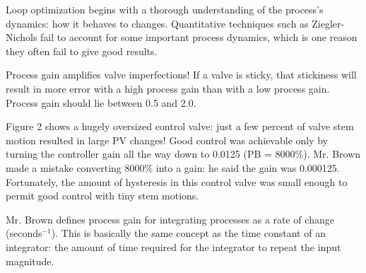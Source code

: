 












Loop optimization begins with a thorough understanding of the process's dynamics: how it behaves to changes.  Quantitative techniques such as Ziegler-Nichols fail to account for some important process dynamics, which is one reason they often fail to give good results.

\vskip 10pt

Process gain amplifies valve imperfections!  If a valve is sticky, that stickiness will result in more error with a high process gain than with a low process gain.  Process gain should lie between 0.5 and 2.0.

\vskip 10pt

Figure 2 shows a hugely oversized control valve: just a few percent of valve stem motion resulted in large PV changes!  Good control was achievable only by turning the controller gain all the way down to 0.0125 (PB = 8000\%).  Mr. Brown made a mistake converting 8000\% into a gain: he said the gain was 0.000125.  Fortunately, the amount of hysteresis in this control valve was small enough to permit good control with tiny stem motions.

\vskip 10pt

Mr. Brown defines process gain for integrating processes as a rate of change (seconds$^{-1}$).  This is basically the same concept as the time constant of an integrator: the amount of time required for the integrator to repeat the input magnitude.








